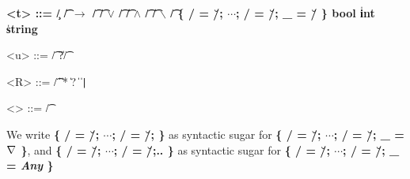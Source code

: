 \begin{grammar}
  \bfseries
  <t> ::= \c/ \| \t/ $\bm{\rightarrow}$ \t/
    \alt \t/ $\bm{\vee}$ \t/ \| \t/ $\bm{\wedge}$ \t/ \| \t/ $\bm{\backslash}$ \t/
    \alt [\meta{R}]
    \alt \{ \s/ = \u/; $\cdots{}$; \s/ = \u/; _ = \u/ \}
    \alt bool \| int \| string

  <u> ::= \t/ \| ?\t/

  <R> ::= \t/ \|  \| * \| ?
    \|   \| \texttt{|}

  <\τ> ::= \t/ %
\end{grammar}

We write \textbf{\{ \s/ = \u/; $\cdots{}$; \s/ = \u/; \}} as
syntactic sugar for \textbf{\{ \s/ = \u/; $\cdots{}$; \s/ = \u/; _ =
$\nabla$ \}}, and \textbf{\{ \s/ = \u/; $\cdots{}$; \s/ = \u/;.. \}}
as syntactic sugar for \textbf{\{ \s/ = \u/; $\cdots{}$; \s/ = \u/; _
= \textmd{\emph{Any}} \}}
